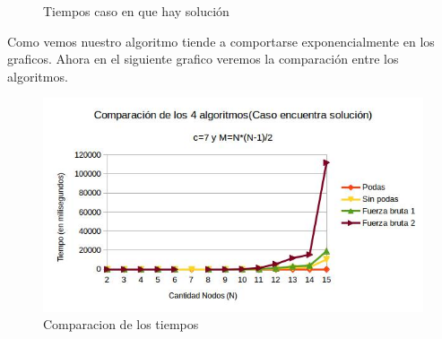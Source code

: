  \begin{figure}
 \centering
 \caption{Tiempos caso en que hay solución}
 \label{tiempos}
\end{figure}

Como vemos nuestro algoritmo tiende a comportarse exponencialmente en los graficos. 
Ahora en el siguiente grafico veremos la comparación  entre los algoritmos.

\begin{figure}[htb]
  \begin{center}
      \includegraphics[scale=0.60]{imagenes/imgEjercicio2/CA4Solucion.jpg}
  \end{center}
  \caption{Comparacion de los tiempos}
\end{figure}

